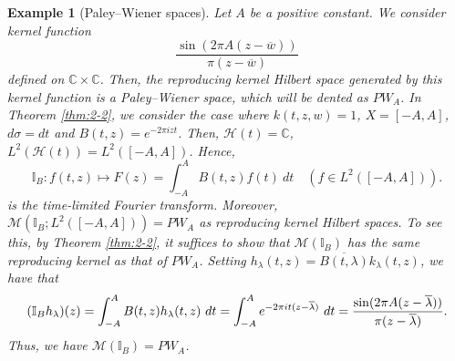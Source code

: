 \documentclass[12pt]{article}
\newtheorem{ex}[thm]{Example}
\numberwithin{equation}{section}
\newcommand{\M}{{\mathcal M}}
\newcommand{\C}{{\mathbb C}}
\newcommand{\bI}{{\mathbb I}}
\newcommand{\cH}{{\mathcal H}}
\newcommand{\lam}{\lambda}
\begin{document}
\begin{ex}[Paley--Wiener spaces]\rm 
Let $A$ be a positive constant. 
We consider kernel function 
\[
\frac{\sin (2\pi A(z-\overline{w}))}{\pi(z-\overline{w})}
\]
defined on $\C\times \C$. 
Then, the reproducing kernel Hilbert space generated by this kernel function  
is a Paley--Wiener space, which will be dented as $PW_A$. 
In Theorem \ref{thm:2-2}, 
we consider the case where $k(t,z,w)=1$, $X=[-A,A]$, $d\sigma=dt$ and $B(t,z)=e^{-2\pi i zt}$. Then, 
$\cH(t)=\C$, 
$L^2(\cH(t))=L^2([-A,A])$. 
Hence, 
\[
\bI_B: 
f(t,z) \mapsto F(z)=\int_{-A}^A B(t,z)f(t)\ dt \quad (f\in L^2([-A,A])).
\]
is the time-limited Fourier transform. 
Moreover, 
$\M(\bI_B; L^2([-A,A]))=PW_A$ as reproducing kernel Hilbert spaces. 
To see this, by Theorem \ref{thm:2-2}, it suffices to show that $\M(\bI_B)$ has the same reproducing kernel as that of $PW_A$.   
Setting $h_{\lam}(t,z)=\overline{B(t,\lam )}k_{\lam}(t,z)$, we have that 
\[
(\bI_B h_{\lam})(z)
=\int_{-A}^AB(t,z)h_{\lam}(t,z)\ dt\\
=\int_{-A}^Ae^{-2\pi i t(z-\overline{\lam})}\ dt\\
=\frac{\sin (2\pi A(z-\overline{\lam}))}{\pi(z-\overline{\lam})}. 
\]
Thus, we have $\M(\bI_B)=PW_A$. 
\end{ex}
\end{document}

